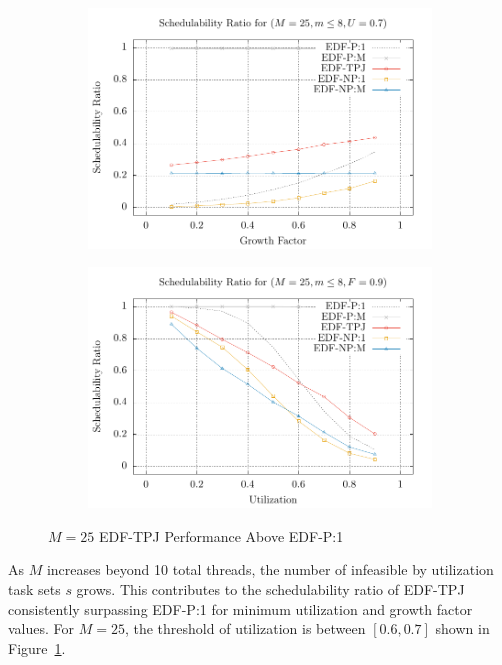 \begin{figure}[h]
  \begin{subfigure}[t]{.5\linewidth}
    \includegraphics[width=\linewidth]{plot/2D-UFS/2D-M025m08U0_7xS}%
  \end{subfigure}%
  \begin{subfigure}[t]{.5\linewidth}
    \includegraphics[width=\linewidth]{plot/2D-UFS/2D-M025m08F0_9xS}%
  \end{subfigure}%
  \caption{${M = 25}$ EDF-TPJ Performance Above EDF-P:1}
  \label{fig:m25-tpj}
\end{figure}

As ${M}$ increases beyond 10 total threads, the number of infeasible
by utilization task sets ${s}$ grows. This contributes to the
schedulability ratio of EDF-TPJ consistently surpassing EDF-P:1 for
minimum utilization and growth factor values. For ${M = 25}$, the
threshold of utilization is between ${[0.6,0.7]}$ shown in
Figure~\ref{fig:m25-tpj}.

